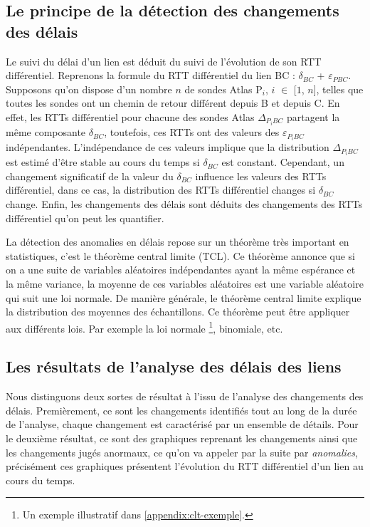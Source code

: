 \subsection{Le principe de la détection des changements des délais}

Le suivi du délai d'un lien est déduit du suivi de l'évolution de son RTT différentiel. Reprenons la formule du RTT différentiel du lien BC :  $\delta_{BC}$ + $\varepsilon_{PBC}$. Supposons qu'on dispose d'un nombre $n$ de sondes Atlas P$_i$, $i$ $\in$ [$1$, $n$], telles que toutes les sondes ont un chemin de retour différent depuis B et depuis C.  En effet, les RTTs différentiel pour chacune des sondes Atlas $\Delta_{P{_i}BC}$ partagent la même composante $\delta_{BC}$, toutefois, ces RTTs ont des valeurs des  $\varepsilon_{P_{i}BC}$ indépendantes. L'indépendance de ces valeurs implique que la distribution $\Delta_{P_{i}BC}$ est estimé d'être stable au cours du temps si $\delta_{BC}$ est constant. Cependant, un changement significatif de la valeur du $\delta_{BC}$ influence les valeurs des RTTs différentiel, dans ce cas, la distribution des RTTs différentiel changes si $\delta_{BC}$ change. Enfin, les changements des délais sont déduits des changements des RTTs différentiel qu'on peut les quantifier.

La détection des anomalies en délais repose sur un théorème très important en statistiques, c'est le théorème  central limite (TCL). Ce théorème  annonce que si on a une suite de variables aléatoires indépendantes ayant la même espérance et la même variance, la moyenne de ces variables aléatoires est une variable aléatoire qui suit une loi normale. De manière générale, le théorème central limite explique la distribution des moyennes des échantillons. Ce théorème peut être appliquer aux différents lois. Par exemple la loi normale \footnote{Un exemple illustratif dans \ref{appendix:clt-exemple}.}, binomiale, etc. 





\subsection{Les résultats de l'analyse des délais des liens}

Nous distinguons deux sortes de résultat à l'issu de l'analyse des changements des délais. Premièrement, ce sont les changements identifiés tout au long de la durée de l'analyse, chaque changement est caractérisé par un ensemble de détails. Pour le deuxième  résultat, ce sont des graphiques reprenant les changements ainsi que les changements jugés anormaux, ce qu'on va appeler par la suite par \textit{anomalies}, précisément ces graphiques présentent l'évolution du RTT différentiel d'un lien au cours du temps.

